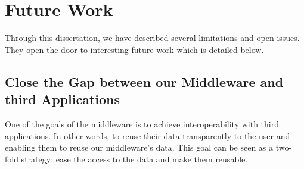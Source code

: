 \section{Future Work}


Through this dissertation, we have described several limitations and open issues.
They open the door to interesting future work which is detailed below.


\subsection{Close the Gap between our Middleware and third Applications}

One of the goals of the middleware is to achieve interoperability with third applications.
In other words, to reuse their data transparently to the user and enabling them to reuse our middleware's data.
This goal can be seen as a two-fold strategy: ease the access to the data and make them reusable.

